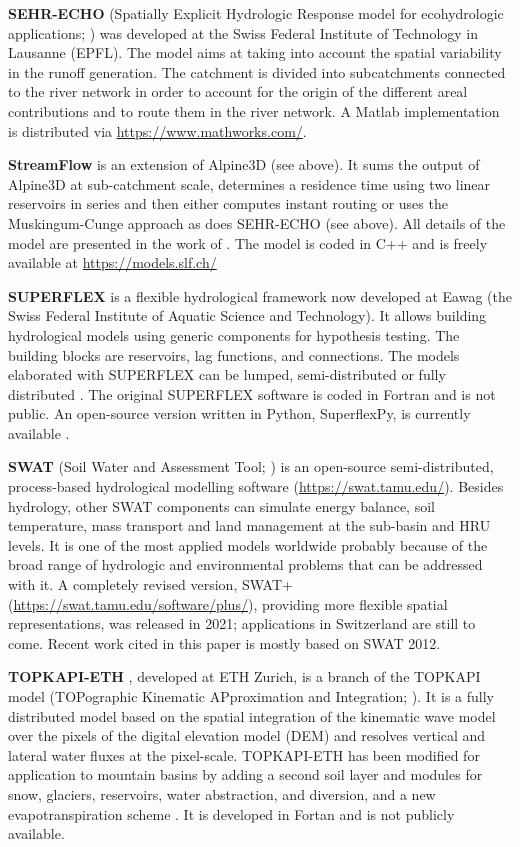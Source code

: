 \documentclass[10pt,a4paper]{article}
\begin{document}
\textbf{SEHR-ECHO} (Spatially Explicit Hydrologic Response model for ecohydrologic applications; \citealp{Schaefli2014}) was developed at the Swiss Federal Institute of Technology in Lausanne (EPFL). The model aims at taking into account the spatial variability in the runoff generation. The catchment is divided into subcatchments connected to the river network in order to account for the origin of the different areal contributions and to route them in the river network. A Matlab implementation is distributed via \url{https://www.mathworks.com/}.

\textbf{StreamFlow} is an extension of Alpine3D (see above). It sums the output of Alpine3D at sub-catchment scale, determines a residence time using two linear reservoirs in series \citep{Comola2015} and then either computes instant routing or uses the Muskingum-Cunge approach as does SEHR-ECHO (see above). All details of the model are presented in the work of \citet{Gallice2016}. The model is coded in C++ and is freely available at \url{https://models.slf.ch/}

\textbf{SUPERFLEX} \citep{Fenicia2011a, Kavetski2011} is a flexible hydrological framework now developed at Eawag (the Swiss Federal Institute of Aquatic Science and Technology). It allows building hydrological models using generic components for hypothesis testing. The building blocks are reservoirs, lag functions, and connections. The models elaborated with SUPERFLEX can be lumped, semi-distributed \citep{Fenicia2016} or fully distributed \citep{Hostache2020}. The original SUPERFLEX software is coded in Fortran and is not public. An open-source version written in Python, SuperflexPy, is currently available \citep{DalMolin2020a}.

\textbf{SWAT} (Soil Water and Assessment Tool; \citealp{Arnold1998}) is an open-source semi-distributed, process-based hydrological modelling software (\url{https://swat.tamu.edu/}). Besides hydrology, other SWAT components can simulate energy balance, soil temperature, mass transport and land management at the sub-basin and HRU levels. It is one of the most applied models worldwide probably because of the broad range of hydrologic and environmental problems that can be addressed with it. A completely revised version, SWAT+ (\url{https://swat.tamu.edu/software/plus/}), providing more flexible spatial representations, was released in 2021; applications in Switzerland are still to come. Recent work cited in this paper is mostly based on SWAT 2012.

\textbf{TOPKAPI-ETH} \citep{Finger2011, Ragettli2012}, developed at ETH Zurich, is a branch of the TOPKAPI model (TOPographic Kinematic APproximation and Integration; \citealp{Todini1995, Todini2002, Liu2002, Ciarapica2002}).  It is a fully distributed model based on the spatial integration  of the kinematic wave model over the pixels of the digital elevation model (DEM) and resolves vertical and lateral water fluxes at the pixel-scale. TOPKAPI-ETH has been modified for application to mountain basins by adding a second soil layer and modules for snow, glaciers, reservoirs, water abstraction, and diversion, and a new evapotranspiration scheme \citep{Finger2011, Finger2012, Fatichi2015}. It is developed in Fortan and is not publicly available.
\end{document}
